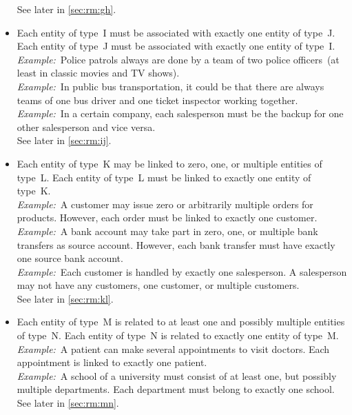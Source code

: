 \begin{itemize}
See later in \cref{sec:rm:gh}.%
%
\item {}
Each entity of type~I must be associated with exactly one entity of type~J.
Each entity of type~J must be associated with exactly one entity of type~I.\\%
\emph{Example:}~Police patrols always are done by a team of two police officers~(at least in classic movies and TV shows).\\%
\emph{Example:}~In public bus transportation, it could be that there are always teams of one bus driver and one ticket inspector working together.\\%
\emph{Example:}~In a certain company, each salesperson must be the backup for one other salesperson and vice versa.~\cite{T2025CDBMS:ERM}\\%
See later in \cref{sec:rm:ij}.%
%
\item {}
Each entity of type~K may be linked to zero, one, or multiple entities of type~L.
Each entity of type~L must be linked to exactly one entity of type~K.~\cite{MA2006MAC:DMERDED,BS2023G:CFNIERD}\\%
\emph{Example:}~A customer may issue zero or arbitrarily multiple orders for products.
However, each order must be linked to exactly one customer.~\cite{BS2023G:CFNIERD}\\%
\emph{Example:}~A bank account may take part in zero, one, or multiple bank transfers as source account.
However, each bank transfer must have exactly one source bank account.~\cite{MA2006MAC:DMERDED}\\%
\emph{Example:}~Each customer is handled by exactly one salesperson.
A salesperson may not have any customers, one customer, or multiple customers.~\cite{T2025CDBMS:ERM}\\%
See later in \cref{sec:rm:kl}.%
%
\item {}
Each entity of type~M is related to at least one and possibly multiple entities of type~N.
Each entity of type~N is related to exactly one entity of type~M.~\cite{BS2023G:EDFAHMSCFN}\\%
\emph{Example:}~A patient can make several appointments to visit doctors.
Each appointment is linked to exactly one patient.~\cite{BS2023G:EDFAHMSCFN}\\%
\emph{Example:}~A school of a university must consist of at least one, but possibly multiple departments.
Each department must belong to exactly one school.~\cite{R2024CDS:E}\\%
See later in \cref{sec:rm:mn}.%

\end{itemize}
